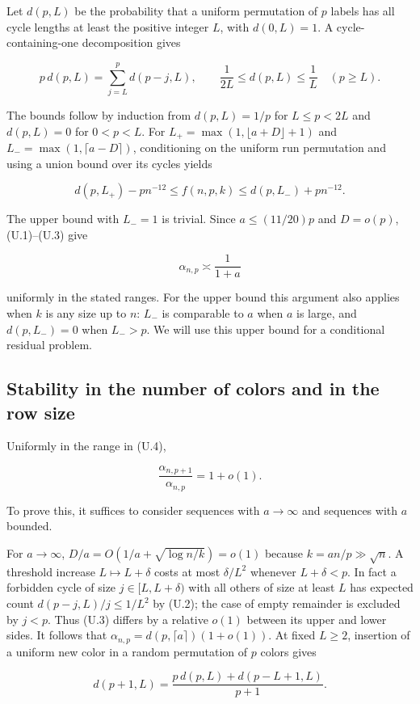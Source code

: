 \documentclass[11pt]{article}
\begin{document}
Let $d(p,L)$ be the probability that a uniform permutation of $p$ labels has all cycle lengths at least the positive integer $L$, with $d(0,L)=1$. A cycle-containing-one decomposition gives

\[
p\,d(p,L)=\sum_{j=L}^p d(p-j,L),\qquad
\frac1{2L}\le d(p,L)\le\frac1L\quad(p\ge L).
\tag{U.2}
\]

The bounds follow by induction from $d(p,L)=1/p$ for $L\le p<2L$ and $d(p,L)=0$ for $0<p<L$. For $L_+=\max(1,\lfloor a+D\rfloor+1)$ and $L_-=\max(1,\lceil a-D\rceil)$, conditioning on the uniform run permutation and using a union bound over its cycles yields

\[
d(p,L_+)-p n^{-12}\le f(n,p,k)\le d(p,L_-)+p n^{-12}.
\tag{U.3}
\]

The upper bound with $L_-=1$ is trivial. Since $a\le(11/20)p$ and $D=o(p)$, (U.1)–(U.3) give

\[
\alpha_{n,p}\asymp \frac1{1+a}
\tag{U.4}
\]

uniformly in the stated ranges. For the upper bound this argument also applies when $k$ is any size up to $n$: $L_-$ is comparable to $a$ when $a$ is large, and $d(p,L_-)=0$ when $L_->p$. We will use this upper bound for a conditional residual problem.

\subsection{Stability in the number of colors and in the row size}

Uniformly in the range in (U.4),

\[
\frac{\alpha_{n,p+1}}{\alpha_{n,p}}=1+o(1).
\tag{U.5}
\]

To prove this, it suffices to consider sequences with $a\to\infty$ and sequences with $a$ bounded.

For $a\to\infty$, $D/a=O(1/a+\sqrt{\log n/k})=o(1)$ because $k=an/p\gg\sqrt n$. A threshold increase $L\mapsto L+\delta$ costs at most $\delta/L^2$ whenever $L+\delta<p$. In fact a forbidden cycle of size $j\in[L,L+\delta)$ with all others of size at least $L$ has expected count $d(p-j,L)/j\le1/L^2$ by (U.2); the case of empty remainder is excluded by $j<p$. Thus (U.3) differs by a relative $o(1)$ between its upper and lower sides. It follows that $\alpha_{n,p}=d(p,\lceil a\rceil)(1+o(1))$. At fixed $L\ge2$, insertion of a uniform new color in a random permutation of $p$ colors gives

\[
d(p+1,L)=\frac{p\,d(p,L)+d(p-L+1,L)}{p+1}.
\tag{U.6}
\]
\end{document}
